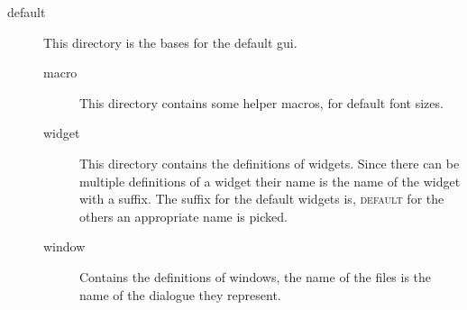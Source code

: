 \begin{description}
\begin{description}
\item[default] This directory is the bases for the default gui.

\begin{description}
\item[macro] This directory contains some helper macros, for default font sizes.
\item[widget] This directory contains the definitions of widgets. Since there
	can be multiple definitions of a widget their name is the name of the widget
	with a suffix. The suffix for the default widgets is, \textsc{default} for
	the others an appropriate name is picked.
\item[window] Contains the definitions of windows, the name of the files is the
	name of the dialogue they represent.
\end{description}

\end{description}

\end{description}


